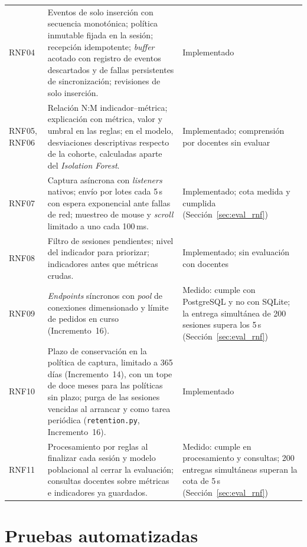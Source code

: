 {\begin{longtable}{>{\raggedright\arraybackslash}p{2.6cm} >{\raggedright\arraybackslash}p{8.2cm} >{\raggedright\arraybackslash}p{2.4cm}}
    RNF04 & Eventos de solo inserción con secuencia monotónica; política inmutable fijada en la sesión; recepción idempotente; \textit{buffer} acotado con registro de eventos descartados y de fallas persistentes de sincronización; revisiones de solo inserción. & Implementado \\
    RNF05, RNF06 & Relación N:M indicador--métrica; explicación con métrica, valor y umbral en las reglas; en el modelo, desviaciones descriptivas respecto de la cohorte, calculadas aparte del \textit{Isolation Forest}. & Implementado; comprensión por docentes sin evaluar \\
    RNF07 & Captura asíncrona con \textit{listeners} nativos; envío por lotes cada 5\,s con espera exponencial ante fallas de red; muestreo de mouse y \textit{scroll} limitado a uno cada 100\,ms. & Implementado; cota medida y cumplida (Sección~\ref{sec:eval_rnf}) \\
    RNF08 & Filtro de sesiones pendientes; nivel del indicador para priorizar; indicadores antes que métricas crudas. & Implementado; sin evaluación con docentes \\
    RNF09 & \textit{Endpoints} síncronos con \textit{pool} de conexiones dimensionado y límite de pedidos en curso (Incremento~16). & Medido: cumple con PostgreSQL y no con SQLite; la entrega simultánea de 200 sesiones supera los 5\,s (Sección~\ref{sec:eval_rnf}) \\
    RNF10 & Plazo de conservación en la política de captura, limitado a 365 días (Incremento~14), con un tope de doce meses para las políticas sin plazo; purga de las sesiones vencidas al arrancar y como tarea periódica (\texttt{retention.py}, Incremento~16). & Implementado \\
    RNF11 & Procesamiento por reglas al finalizar cada sesión y modelo poblacional al cerrar la evaluación; consultas docentes sobre métricas e indicadores ya guardados. & Medido: cumple en procesamiento y consultas; 200 entregas simultáneas superan la cota de 5\,s (Sección~\ref{sec:eval_rnf}) \\
\end{longtable}
}

\section{Pruebas automatizadas}
\label{sec:impl_pruebas}

